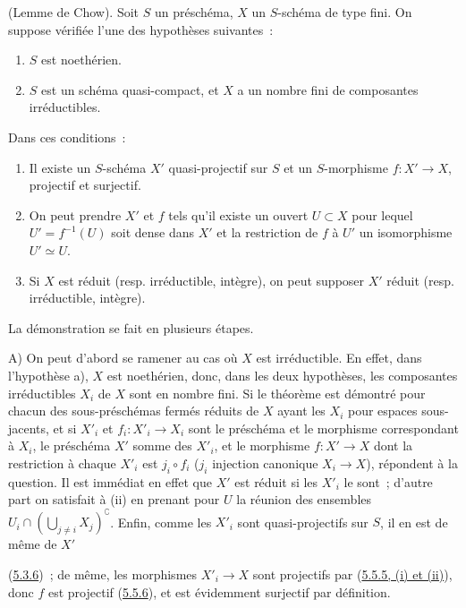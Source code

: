 \begin{theorem}[5.6.1]
\label{II.5.6.1-fr}
(Lemme de Chow). Soit $S$ un préschéma, $X$ un $S$-schéma de type fini. On
suppose vérifiée l'une des hypothèses suivantes~:
\begin{enumerate}
  \item[\rm{a)}] $S$ est noethérien.
  \item[\rm{b)}] $S$ est un schéma quasi-compact, et $X$ a un nombre fini de
  composantes irréductibles.
\end{enumerate}
Dans ces conditions~:
\begin{enumerate}
  \item[\rm{(i)}] Il existe un $S$-schéma $X'$ quasi-projectif sur $S$ et un
  $S$-morphisme $f:X'\to X$, projectif et surjectif.
  \item[\rm{(ii)}] On peut prendre $X'$ et $f$ tels qu'il existe un ouvert
  $U\subset X$ pour lequel $U'=f^{-1}(U)$ soit dense dans $X'$ et la
  restriction de $f$ à $U'$ un isomorphisme $U'\simeq U$.
  \item[\rm{(iii)}] Si $X$ est réduit (resp. irréductible, intègre), on peut
  supposer $X'$ réduit (resp. irréductible, intègre).
\end{enumerate}
\end{theorem}

La démonstration se fait en plusieurs étapes.

A) On peut d'abord se ramener au cas où $X$ est irréductible. En effet, dans
l'hypothèse a), $X$ est noethérien, donc, dans les deux hypothèses, les
composantes irréductibles $X_i$ de $X$ sont en nombre fini. Si le théorème est
démontré pour chacun des sous-préschémas fermés réduits de $X$ ayant les $X_i$
pour espaces sous-jacents, et si $X'_i$ et $f_i:X'_i\to X_i$ sont le préschéma
et le morphisme correspondant à $X_i$, le préschéma $X'$ somme des $X'_i$, et
le morphisme $f:X'\to X$ dont la restriction à chaque $X'_i$ est $j_i\circ f_i$
($j_i$ injection canonique $X_i\to X$), répondent à la question. Il est
immédiat en effet que $X'$ est réduit si les $X'_i$ le sont~; d'autre part on
satisfait à (ii) en prenant pour $U$ la réunion des ensembles
$U_i\cap(\bigcup_{j\neq i}X_j)^{\complement}$. Enfin, comme les $X'_i$ sont
quasi-projectifs sur $S$, il en est de même de $X'$


(\hyperref[II.5.3.6-fr]{5.3.6})~; de même, les morphismes $X'_i\to X$ sont
projectifs par (\hyperref[II.5.5.5-fr]{5.5.5, (i) et (ii)}), donc $f$ est
projectif (\hyperref[II.5.5.6-fr]{5.5.6}), et est évidemment surjectif par
définition.

